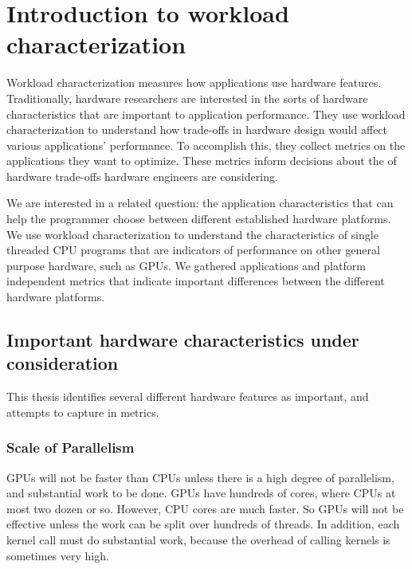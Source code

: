 \documentclass[12pt,twoside]{reedthesis}
\begin{document}
	\section{Introduction to workload characterization}
		\label{s:workload-characht}
	
		Workload characterization measures how applications use hardware features. %
		Traditionally, hardware researchers are interested in the sorts of hardware characteristics that are important to application performance. They use workload characterization to understand how trade-offs in hardware design would affect various applications' performance. To accomplish this, they collect metrics on the applications they want to optimize. These metrics inform decisions about the of hardware trade-offs hardware engineers are considering. 
		
		We are interested in a related question: the application characteristics that can help the programmer choose between different established hardware platforms. We use workload characterization to understand the characteristics of single threaded CPU programs that are indicators of performance on other general purpose hardware, such as GPUs. We gathered applications and platform independent metrics that indicate important differences between the different hardware platforms. 
		
		\subsection{Important hardware characteristics under consideration}
		
		This thesis identifies several different hardware features as important, and attempts to capture in metrics. 
		
		\subsubsection{Scale of Parallelism}
		
		GPUs will not be faster than CPUs unless there is a high degree of parallelism, and substantial work to be done. GPUs have hundreds of cores, where CPUs at most two dozen or so. However, CPU cores are much faster. So GPUs will not be effective unless the work can be split over hundreds of threads. In addition, each kernel call must do substantial work, because the overhead of calling kernels is sometimes very high.  
		
\end{document}
